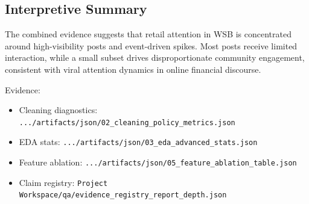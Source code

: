 \subsection{Interpretive Summary}
The combined evidence suggests that retail attention in WSB is concentrated around high-visibility posts and event-driven spikes. Most posts receive limited interaction, while a small subset drives disproportionate community engagement, consistent with viral attention dynamics in online financial discourse.

Evidence:
\begin{itemize}
  \item Cleaning diagnostics: \verb|.../artifacts/json/02_cleaning_policy_metrics.json|
  \item EDA stats: \verb|.../artifacts/json/03_eda_advanced_stats.json|
  \item Feature ablation: \verb|.../artifacts/json/05_feature_ablation_table.json|
  \item Claim registry: \verb|Project Workspace/qa/evidence_registry_report_depth.json|
\end{itemize}
